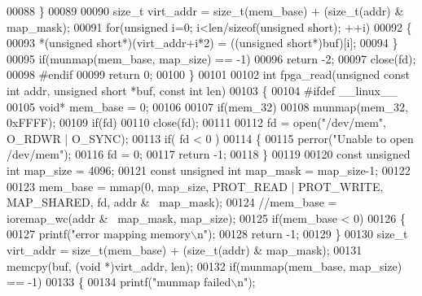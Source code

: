 \begin{DoxyCode}
00088     \}
00089 
00090     \textcolor{keywordtype}{size\_t} virt\_addr = size\_t(mem\_base) + (size\_t(addr) & map\_mask);
00091     \textcolor{keywordflow}{for}(\textcolor{keywordtype}{unsigned} i=0; i<len/\textcolor{keyword}{sizeof}(\textcolor{keywordtype}{unsigned} short); ++i)
00092     \{
00093         *(\textcolor{keywordtype}{unsigned} \textcolor{keywordtype}{short}*)(virt\_addr+i*2) = ((\textcolor{keywordtype}{unsigned} \textcolor{keywordtype}{short}*)buf)[i];
00094     \}
00095     \textcolor{keywordflow}{if}(munmap(mem\_base, map\_size) == -1)
00096         \textcolor{keywordflow}{return} -2;
00097     close(fd);
00098 \textcolor{preprocessor}{#endif}
00099     \textcolor{keywordflow}{return} 0;
00100 \}
00101 
00102 \textcolor{keywordtype}{int} fpga_read(\textcolor{keywordtype}{unsigned} \textcolor{keyword}{const} \textcolor{keywordtype}{int} addr, \textcolor{keywordtype}{unsigned} \textcolor{keywordtype}{short} *buf, \textcolor{keyword}{const} \textcolor{keywordtype}{int} len)
00103 \{
00104 \textcolor{preprocessor}{#ifdef \_\_linux\_\_}
00105     \textcolor{keywordtype}{void}* mem\_base = 0;
00106 
00107     \textcolor{keywordflow}{if}(mem\_32)
00108         munmap(mem\_32, 0xFFFF);
00109     \textcolor{keywordflow}{if}(fd)
00110         close(fd);
00111 
00112     fd = open(\textcolor{stringliteral}{"/dev/mem"}, O\_RDWR | O\_SYNC);
00113     \textcolor{keywordflow}{if}( fd < 0 )
00114     \{
00115         perror(\textcolor{stringliteral}{"Unable to open /dev/mem"});
00116         fd = 0;
00117         \textcolor{keywordflow}{return} -1;
00118     \}
00119 
00120     \textcolor{keyword}{const} \textcolor{keywordtype}{unsigned} \textcolor{keywordtype}{int} map\_size = 4096;
00121     \textcolor{keyword}{const} \textcolor{keywordtype}{unsigned} \textcolor{keywordtype}{int} map\_mask = map\_size-1;
00122 
00123     mem\_base = mmap(0, map\_size, PROT\_READ | PROT\_WRITE, MAP\_SHARED, fd, addr & ~map\_mask);
00124     \textcolor{comment}{//mem\_base = ioremap\_wc(addr & ~map\_mask, map\_size);}
00125     \textcolor{keywordflow}{if}(mem\_base < 0)
00126     \{
00127         printf(\textcolor{stringliteral}{"error mapping memory\(\backslash\)n"});
00128         \textcolor{keywordflow}{return} -1;
00129     \}
00130     \textcolor{keywordtype}{size\_t} virt\_addr = size\_t(mem\_base) + (size\_t(addr) & map\_mask);
00131     memcpy(buf, (\textcolor{keywordtype}{void} *)virt\_addr, len);
00132     \textcolor{keywordflow}{if}(munmap(mem\_base, map\_size) == -1)
00133     \{
00134         printf(\textcolor{stringliteral}{"munmap failed\(\backslash\)n"});

\end{DoxyCode}
